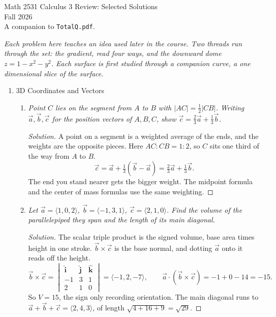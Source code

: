 \documentclass[12pt]{article}
\newcommand{\ihat}{\hat{\mathbf{i}}}
\newcommand{\jhat}{\hat{\mathbf{j}}}
\newcommand{\khat}{\hat{\mathbf{k}}}
\newenvironment{solution}
  {\renewcommand\qedsymbol{$\blacksquare$}\begin{proof}[Solution]}
  {\end{proof}}
\newcounter{topic}
\begin{document}
\raggedright
\begin{center}
      {\large Math 2531 Calculus 3 Review: Selected Solutions}\\
  {Fall 2026}\\
  \small A companion to \texttt{TotalQ.pdf}.
\end{center}

\noindent\textit{Each problem here teaches an idea used later in the course. Two threads run through the set: the gradient, read four ways, and the downward dome $z=1-x^2-y^2$. Each surface is first studied through a companion curve, a one dimensional slice of the surface.}

\begin{enumerate}\setcounter{enumi}{\value{topic}}



\item 3D Coordinates and Vectors

    \begin{enumerate}
    \item \textit{Point $C$ lies on the segment from $A$ to $B$ with $|AC|=\tfrac12|CB|$. Writing $\vec a,\vec b,\vec c$ for the position vectors of $A,B,C$, show $\vec c=\tfrac23\vec a+\tfrac13\vec b$.}

    \begin{solution}
    A point on a segment is a weighted average of the ends, and the weights are the opposite pieces. Here $AC:CB=1:2$, so $C$ sits one third of the way from $A$ to $B$.
    \[
      \vec c=\vec a+\tfrac13(\vec b-\vec a)=\tfrac23\vec a+\tfrac13\vec b.
    \]
    The end you stand nearer gets the bigger weight. The midpoint formula and the center of mass formulas use the same weighting.
    \end{solution}

    \item \textit{Let $\vec a=\langle1,0,2\rangle$, $\vec b=\langle-1,3,1\rangle$, $\vec c=\langle2,1,0\rangle$. Find the volume of the parallelepiped they span and the length of its main diagonal.}

    \begin{solution}
    The scalar triple product is the signed volume, base area times height in one stroke. $\vec b\times\vec c$ is the base normal, and dotting $\vec a$ onto it reads off the height.
    \[
    \vec b\times\vec c=\begin{vmatrix}\ihat&\jhat&\khat\\-1&3&1\\2&1&0\end{vmatrix}=\langle-1,2,-7\rangle,
    \qquad \vec a\cdot(\vec b\times\vec c)=-1+0-14=-15.
    \]
    So $V=15$, the sign only recording orientation. The main diagonal runs to $\vec a+\vec b+\vec c=\langle2,4,3\rangle$, of length $\sqrt{4+16+9}=\sqrt{29}$.


\end{solution}
\end{enumerate}
\end{enumerate}
\end{document}
